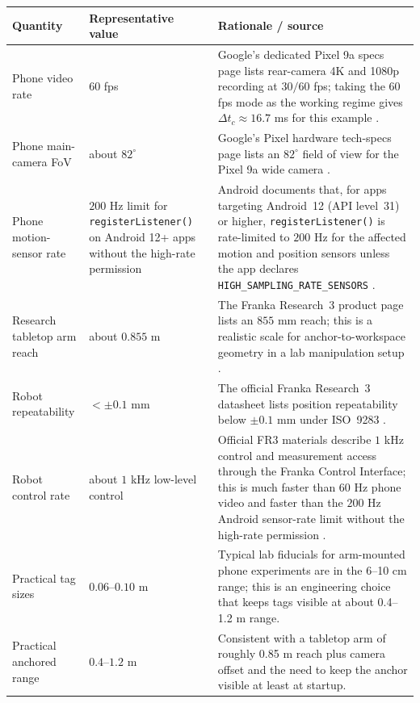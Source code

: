 \documentclass[11pt]{report}
\begin{document}
\begin{table}[H]
\centering
\scriptsize
\setlength{\tabcolsep}{3.8pt}
\begin{tabularx}{\textwidth}{L{0.22\textwidth}L{0.20\textwidth}Y}
\toprule
\textbf{Quantity} & \textbf{Representative value} & \textbf{Rationale / source}\\
\midrule
Phone video rate & $60$ fps & Google's dedicated Pixel 9a specs page lists rear-camera 4K and 1080p recording at $30/60$ fps; taking the $60$ fps mode as the working regime gives $\Delta t_c\approx 16.7$ ms for this example \citep{pixel9a_specs}.\\
Phone main-camera FoV & about $82^{\circ}$ & Google's Pixel hardware tech-specs page lists an $82^{\circ}$ field of view for the Pixel 9a wide camera \citep{pixel9a_specs}.\\
Phone motion-sensor rate & $200$ Hz limit for \texttt{registerListener()} on Android 12+ apps without the high-rate permission & Android documents that, for apps targeting Android~12 (API level~31) or higher, \texttt{registerListener()} is rate-limited to $200$ Hz for the affected motion and position sensors unless the app declares \texttt{HIGH\_SAMPLING\_RATE\_SENSORS} \citep{android_sensors_overview}.\\
Research tabletop arm reach & about $0.855$ m & The Franka Research~3 product page lists an $855$ mm reach; this is a realistic scale for anchor-to-workspace geometry in a lab manipulation setup \citep{franka_fr3}.\\
Robot repeatability & $<\pm 0.1$ mm & The official Franka Research~3 datasheet lists position repeatability below $\pm 0.1$ mm under ISO~9283 \citep{franka_fr3}.\\
Robot control rate & about $1$ kHz low-level control & Official FR3 materials describe $1$ kHz control and measurement access through the Franka Control Interface; this is much faster than $60$ Hz phone video and faster than the $200$ Hz Android sensor-rate limit without the high-rate permission \citep{franka_fr3,pixel9a_specs,android_sensors_overview}.\\
Practical tag sizes & $0.06$--$0.10$ m & Typical lab fiducials for arm-mounted phone experiments are in the 6--10 cm range; this is an engineering choice that keeps tags visible at about 0.4--1.2 m range.\\
Practical anchored range & $0.4$--$1.2$ m & Consistent with a tabletop arm of roughly 0.85 m reach plus camera offset and the need to keep the anchor visible at least at startup.\\

\end{tabularx}
\end{table}
\end{document}
